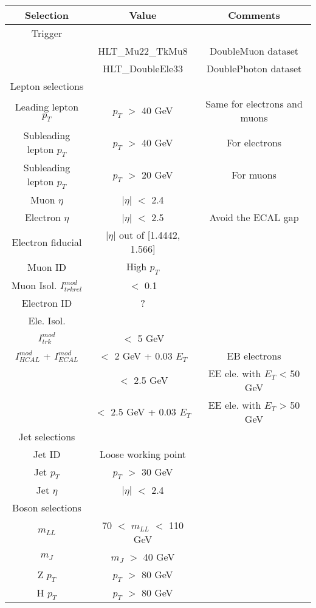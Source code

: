 \documentclass[12pt]{article} %
\begin{document}
\begin{center}
  \begin{tabular}{ c c c }
    \hline
    \bf Selection &
    \bf Value &
    \bf Comments \\
    \hline
    Trigger & & \\ \cline{1-1}
    & HLT\_Mu22\_TkMu8 & DoubleMuon dataset \\
    & HLT\_DoubleEle33 & DoublePhoton dataset \\ \hline
    Lepton selections & & \\ \cline{1-1}
    Leading lepton $p_T$ & $p_T$ $>$ 40 GeV & Same for electrons and muons \\ 
    Subleading lepton $p_T$ & $p_T$ $>$ 40 GeV & For electrons \\ 
    Subleading lepton $p_T$ & $p_T$ $>$ 20 GeV & For muons \\ 
    Muon $\eta$ & $\left|{\eta}\right|$ $<$ 2.4 &  \\
    Electron $\eta$ & $\left|{\eta}\right|$ $<$ 2.5 & Avoid the ECAL gap \\
    Electron fiducial & $\left|{\eta}\right|$ out of [1.4442, 1.566] &  \\ \cline{1-1}
    Muon ID & High $p_T$ &  \\
    Muon Isol. $I^{mod}_{trkrel}$ & $<$ 0.1 &  \\ \cline{1-1}
    Electron ID & ? &  \\
    Ele. Isol. & &  \\
    $I^{mod}_{trk}$ & $<$ 5 GeV &  \\
    $I^{mod}_{HCAL}$ + $I^{mod}_{ECAL}$ & $<$ 2 GeV + 0.03 $E_T$ & EB electrons \\
    & $<$ 2.5 GeV & EE ele. with $E_T$ < 50 GeV \\
    & $<$ 2.5 GeV + 0.03 $E_T$ & EE ele. with $E_T$ > 50 GeV \\ \hline
    Jet selections & & \\  \cline{1-1}
    Jet ID & Loose working point & \\
    Jet $p_T$ & $p_T$ $>$ 30 GeV & \\
    Jet $\eta$ & $\left|{\eta}\right|$ $<$ 2.4 & \\ \hline
    Boson selections & & \\  \cline{1-1}
    $m_{LL}$ & 70 $<$ $m_{LL}$ $<$ 110 GeV & \\
    $m_{J}$ & $m_{J}$ $>$ 40 GeV & \\
    Z $p_T$ & $p_T$ $>$ 80 GeV & \\
    H $p_T$ & $p_T$ $>$ 80 GeV & \\
    \hline
  \end{tabular}
  \label{tab:selection}
\end{center}
\end{document}
